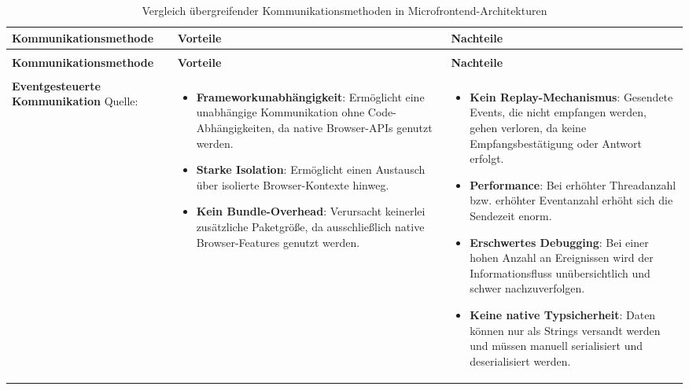 \begingroup
\small
\renewcommand{\arraystretch}{1.15}
\begin{xltabular}{\textwidth}{>{\hsize\raggedright\arraybackslash}X|>{\hsize\raggedright\arraybackslash}X|>{\hsize\raggedright\arraybackslash}X}
  \caption{Vergleich übergreifender Kommunikationsmethoden in Microfrontend-Architekturen}
  \label{tab:mfe_communication_comparison} \\
  \hline
  \textbf{Kommunikationsmethode} & \textbf{Vorteile} & \textbf{Nachteile} \\ \hline
  \endfirsthead

   \\ \hline
  \textbf{Kommunikationsmethode} & \textbf{Vorteile} & \textbf{Nachteile} \\ \hline
  \endhead

  \hline
   \\
  \endfoot

  \hline
  \endlastfoot

  \textbf{Eventgesteuerte Kommunikation} \newline Quelle: \cite[Kap.~3]{perera2023enhancing} &
  \begin{itemize}[leftmargin=*]
    \item \textbf{Frameworkunabhängigkeit}: Ermöglicht eine unabhängige Kommunikation ohne Code-Abhängigkeiten, da native Browser-APIs genutzt werden.
    \item \textbf{Starke Isolation}: Ermöglicht einen Austausch über isolierte Browser-Kontexte hinweg.
    \item \textbf{Kein Bundle-Overhead}: Verursacht keinerlei zusätzliche Paketgröße, da ausschließlich native Browser-Features genutzt werden.
  \end{itemize} &
  \begin{itemize}[leftmargin=*]
    \item \textbf{Kein Replay-Mechanismus}: Gesendete Events, die nicht empfangen werden, gehen verloren, da keine Empfangsbestätigung oder Antwort erfolgt.
    \item \textbf{Performance}: Bei erhöhter Threadanzahl bzw. erhöhter Eventanzahl erhöht sich die Sendezeit enorm.
    \item \textbf{Erschwertes Debugging}: Bei einer hohen Anzahl an Ereignissen wird der Informationsfluss unübersichtlich und schwer nachzuverfolgen.
    \item \textbf{Keine native Typsicherheit}: Daten können nur als Strings versandt werden und müssen manuell serialisiert und deserialisiert werden.
  \end{itemize} \\ \hline


\end{xltabular}
